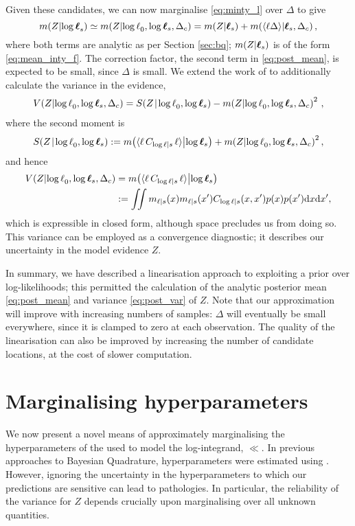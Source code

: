 \documentclass{article} %
\begin{document}
Given these candidates, we can now marginalise \eqref{eq:minty_l} over $\Delta$ to give
\begin{equation} \label{eq:post_mean}
\mean{\If}{\vll_s} \simeq \mean{\If}{\ll_0,\tvr_s,\Delta_c} =
\mean{\If}{\vr_s} + \mean{\inty{\lfn \Delta}}{\vr_s, \Delta_c},
\end{equation}
where both terms are analytic as per Section \ref{sec:bq}; $\mean{\If}{\vr_s}$ is of the form \eqref{eq:mean_inty_f}. The correction factor, the second term in \eqref{eq:post_mean}, is expected to be small, since $\Delta$ is small. We extend the work of \cite{BQR} to additionally calculate the variance in the evidence,
\begin{align} 
\cov{\If}{\ll_0,\tvr_s,\Delta_c} = \secm{\If}{\ll_0,\tvr_s} - \mean{\If}{\ll_0,\tvr_s,\Delta_c}^2\,,
\end{align}
where the second moment is 
\begin{align}
\secm{\If}{\ll_0,\tvr_s} \deq  \mean{\inty{\lfn\,C_{\ll|s}\,\lfn}}{\tvr_s}+
\mean{\If}{\ll_0,\tvr_s,\Delta_c}^2,
\end{align}
and hence 
\begin{align} \label{eq:post_var}
\cov{\If}{\ll_0,\tvr_s,\Delta_c}  & = \mean{\inty{\lfn\,C_{\ll|s}\,\lfn}}{\tvr_s} \nonumber\\
& \deq
 \iint m_{\lfn|s}(\lfv) m_{\lfn|s}(\lfv') C_{\ll|s}(\lfv,\lfv')  p(x) p(x') \ud \lfv \ud\lfv',
\end{align}
which is expressible in closed form, although space precludes us from doing so. This variance can be employed as a convergence diagnostic; it describes our uncertainty in the model evidence $Z$.

In summary, we have described a linearisation approach to exploiting a  prior over log-likelihoods; this permitted the calculation of the analytic posterior mean \eqref{eq:post_mean} and variance \eqref{eq:post_var} of $Z$. Note that our approximation will improve with increasing numbers of samples: $\Delta$ will
eventually be small everywhere, since it is clamped to zero at each observation. 
The quality of the linearisation can also be improved by increasing the number of candidate locations, at the cost of slower computation.

\section{Marginalising hyperparameters}
\label{sec:marginalising}

We now present a novel means of approximately marginalising the hyperparameters of the \gpb used to model the log-integrand, $\ll$. In previous approaches to Bayesian Quadrature, hyperparameters were estimated using
 . However, ignoring the uncertainty in the hyperparameters to which our predictions are sensitive can lead to pathologies. In particular, the reliability of the variance for $Z$ depends crucially upon marginalising over all unknown quantities. 
\end{document}

